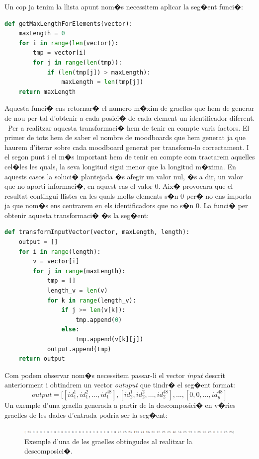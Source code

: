 \documentclass[12pt,a4paper,openright,oneside]{article}
\numberwithin{equation}{section}
\theoremstyle{definition}
\begin{document}
Un cop ja tenim la llista apunt nom�s necessitem aplicar la seg�ent funci�:
\begin{lstlisting}[language=Python,basicstyle=\footnotesize\ttfamily]
def getMaxLengthForElements(vector):
    maxLength = 0
    for i in range(len(vector)):
        tmp = vector[i]
        for j in range(len(tmp)):
            if (len(tmp[j]) > maxLength):
                maxLength = len(tmp[j])
    return maxLength
\end{lstlisting}
Aquesta funci� ens retornar� el numero m�xim de graelles que hem de generar de nou per tal d'obtenir a cada posici� de cada element un identificador diferent.\\\
Per a realitzar aquesta transformaci� hem de tenir en compte varis factors. El primer de tots hem de saber el nombre de moodboards que hem generat ja que haurem d'iterar sobre cada moodboard generat per transform-lo correctament. I el segon punt i el m�s important hem de tenir en compte com tractarem aquelles cel�les les quals, la seva longitud sigui menor que la longitud m�xima. En aquests casos la soluci� plantejada �s afegir un valor nul, �s a dir, un valor que no aporti informaci�, en aquest cas el valor 0. Aix� provocara que el resultat contingui llistes en les quals molts elements s�n 0 per� no ens importa ja que nom�s ens centrarem en els identificadors que no s�n 0. La funci� per obtenir aquesta transformaci� �s la seg�ent:
\begin{lstlisting}[language=Python,basicstyle=\footnotesize\ttfamily]
def transformInputVector(vector, maxLength, length):
    output = []
    for i in range(length):
        v = vector[i]
        for j in range(maxLength):
            tmp = []
            length_v = len(v)
            for k in range(length_v):
                if j >= len(v[k]):
                    tmp.append(0)
                else:
                    tmp.append(v[k][j])
            output.append(tmp)
    return output
\end{lstlisting}
Com podem observar nom�s necessitem passar-li el vector \textit{input} descrit anteriorment i obtindrem un vector \textit{outuput} que tindr� el seg�ent format:
\[output = [[id_1^1, id_1^2,..., id_1^{48}],
[id_2^1, id_2^2,..., id_2^{48}],..., [0,0,...,id_y^{48}]\]
Un exemple d'una graella generada a partir de la descomposici� en v�ries graelles de les dades d'entrada podria ser la seg�ent:
\begin{figure}[h!]
\begin{center}
\includegraphics[width=\textwidth]{id_s}
\caption{Exemple d'una de les graelles obtingudes al realitzar la descomposici�.}
\end{center}
\end{figure}
\end{document}
